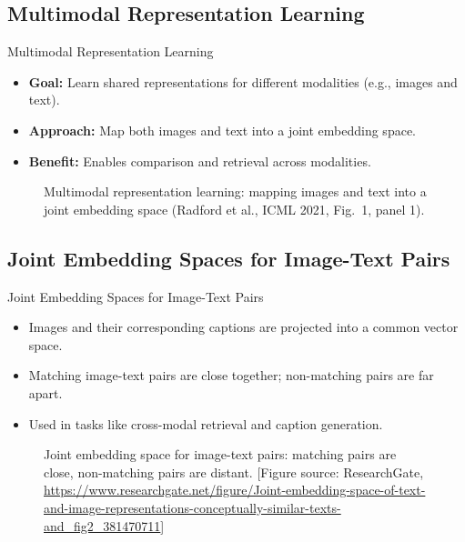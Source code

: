 \subsection{Multimodal Representation Learning}
\begin{frame}[allowframebreaks]{Multimodal Representation Learning}
    \begin{itemize}
        \item \textbf{Goal:} Learn shared representations for different modalities (e.g., images and text).
        \item \textbf{Approach:} Map both images and text into a joint embedding space.
        \item \textbf{Benefit:} Enables comparison and retrieval across modalities.
    \end{itemize}
\framebreak
    \begin{figure}
        \centering
        \caption*{Multimodal representation learning: mapping images and text into a joint embedding space (Radford et al., ICML 2021, Fig.~1, panel 1).}
    \end{figure}
\end{frame}

\subsection{Joint Embedding Spaces for Image-Text Pairs}
\begin{frame}[allowframebreaks]{Joint Embedding Spaces for Image-Text Pairs}
    \begin{itemize}
        \item Images and their corresponding captions are projected into a common vector space.
        \item Matching image-text pairs are close together; non-matching pairs are far apart.
        \item Used in tasks like cross-modal retrieval and caption generation.
    \end{itemize}
\framebreak
    \begin{figure}
        \centering
        \caption*{Joint embedding space for image-text pairs: matching pairs are close, non-matching pairs are distant. {\scriptsize [Figure source: ResearchGate, \url{https://www.researchgate.net/figure/Joint-embedding-space-of-text-and-image-representations-conceptually-similar-texts-and_fig2_381470711}]}}
    \end{figure}
\end{frame}

